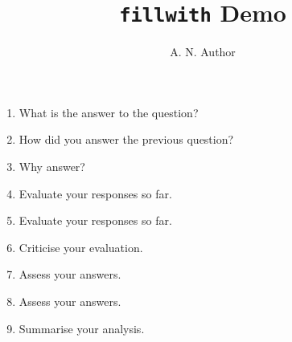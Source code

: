 \documentclass[british,a6paper]{article}
\begin{document}
\author{A. N. Author}
\title{\texttt{fillwith} Demo}
\maketitle
\begin{enumerate}
  \item What is the answer to the question?
    \fillwithrules
  \item How did you answer the previous question?
    \fillwith*[style=line]
  \item Why answer?

    \fillwith*[style=rule,fillwith ht=1.25,colour=blue!40!cyan]
    \clearpage
  \item Evaluate your responses so far.
    \fillwithdottedlines
  \item Evaluate your responses so far.

    {%
      \fillwithdottedlines[1.5]
    }
  \item Criticise your evaluation.
    \fillwithdottedlines*
    \clearpage
  \item Assess your answers.
    \fillwithnolines[goal ht = .33\textheight]
  \item Assess your answers.

    \fillwithnolines[style=rules,no font=\bfseries\tiny,colour=green!50!gray,goal ht = .67\textheight]
  \item Summarise your analysis.
    \fillwithnolines*
\end{enumerate}
\end{document}
